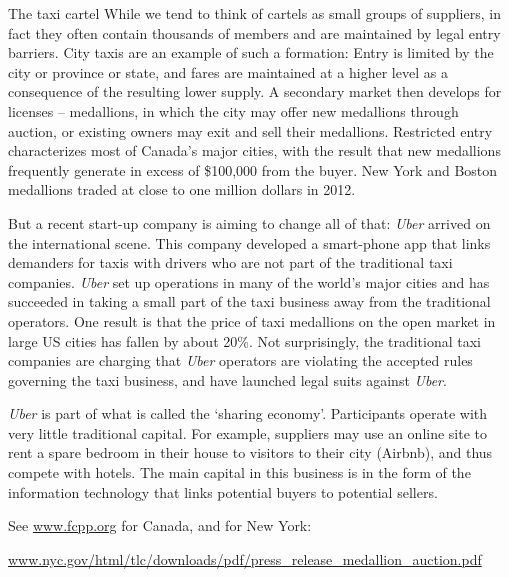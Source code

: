\begin{ApplicationBox}{The taxi cartel \label{app:taxicartel}}
While we tend to think of cartels as small groups of suppliers, in fact they often contain thousands of members and are maintained by legal entry barriers. City taxis are an example of such a formation: Entry is limited by the city or province or state, and fares are maintained at a higher level as a consequence of the resulting lower supply. A secondary market then develops for licenses -- medallions, in which the city may offer new medallions through auction, or existing owners may exit and sell their medallions. Restricted entry characterizes most of Canada's major cities, with the result that new medallions frequently generate in excess of \$100,000 from the buyer. New York and Boston medallions traded at close to one million dollars in 2012.

\bigskip
But a recent start-up company is aiming to change all of that: \textit{Uber} arrived on the international scene. This company developed a smart-phone app that links demanders for taxis with drivers who are not part of the traditional taxi companies. \textit{Uber} set up operations in many of the world's major cities and has succeeded in taking a small part of the taxi business away from the traditional operators. One result is that the price of taxi medallions on the open market in large US cities has fallen by about 20\%. Not surprisingly, the traditional taxi companies are charging that \textit{Uber} operators are violating the accepted rules governing the taxi business, and have launched legal suits against \textit{Uber}.

\bigskip 
\textit{Uber} is part of what is called the `sharing economy'. Participants operate with very little traditional capital. For example, suppliers may use an online site to rent a spare bedroom in their house to visitors to their city (Airbnb), and thus compete with hotels. The main capital in this business is in the form of the information technology that links potential buyers to potential sellers.

\bigskip
See \href{www.fcpp.org}{www.fcpp.org} for Canada, and for New York:

\bigskip
\href{www.nyc.gov/html/tlc/downloads/pdf/press_release_medallion_auction.pdf}{www.nyc.gov/html/tlc/downloads/pdf/press\_release\_medallion\_auction.pdf}
\end{ApplicationBox}